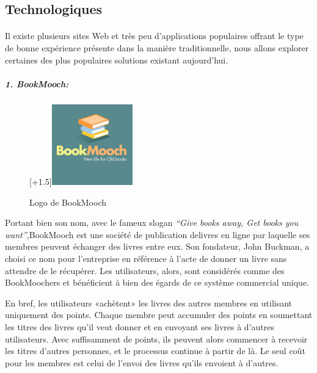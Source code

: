 \subsection{Technologiques}

\paragraph*{}
Il existe plusieurs sites Web et très peu d'applications populaires offrant le type de bonne expérience présente dans la manière traditionnelle, nous allons explorer certaines des plus populaires solutions existant aujourd’hui.\\

\subparagraph{{\large 1. BookMooch:}\medskip \\}

\begin{figure}
	\raisebox{0pt}[\dimexpr\height+1.5\baselineskip\relax]{\includegraphics[width=3.5cm]{Images/chapter1/bookMoochLogo.jpg}}
	\caption{{\footnotesize Logo de BookMooch}}
\end{figure}

Portant bien son nom, avec le fameux slogan \textit{​“Give books away, Get books you want”},BookMooch est une société de publication delivres en ligne par laquelle ses membres peuvent échanger des livres entre eux. Son fondateur,
John Buckman, a choisi ce nom pour l'entreprise en référence à l'acte de donner un livre sans attendre de le récupérer. Les utilisateurs, alors, sont considérés comme des BookMoochers et bénéficient à bien des égards de ce système commercial unique.

En bref, les utilisateurs «achètent» les livres des autres membres	en utilisant uniquement des points. Chaque membre peut accumuler des points en soumettant les titres des livres qu'il veut donner et en envoyant ses livres à d'autres utilisateurs. Avec suffisamment de points, ils peuvent alors commencer à recevoir les titres d'autres personnes, et le processus continue à partir de là. Le seul coût pour les membres est celui de l'envoi des livres qu'ils envoient à d'autres.\cite{noauthor_bookmooch_nodate}\\

